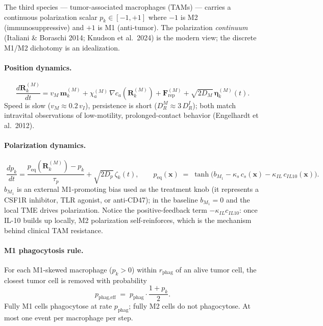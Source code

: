 \documentclass[11pt,letterpaper]{article}
\begin{document}
The third species --- tumor-associated macrophages (TAMs) --- carries a
continuous polarization scalar $p_k \in [-1,+1]$ where $-1$ is M2
(immunosuppressive) and $+1$ is M1 (anti-tumor). The polarization
\emph{continuum} (Italiani \& Boraschi 2014; Knudson et al.\ 2024) is
the modern view; the discrete M1/M2 dichotomy is an idealization.

\paragraph{Position dynamics.}
\begin{equation}
\frac{d\mathbf{R}_k^{(M)}}{dt}
  = v_M\, \mathbf{m}_k^{(M)}
  + \chi_a^{(M)}\, \nabla c_a(\mathbf{R}_k^{(M)})
  + \mathbf{F}_{\text{rep}}^{(M)}
  + \sqrt{2 D_M}\,\bm{\eta}_k^{(M)}(t).
\end{equation}
Speed is slow ($v_M \approx 0.2\,v_I$), persistence is short
($D_R^M \approx 3\,D_R^I$); both match intravital observations of
low-motility, prolonged-contact behavior (Engelhardt et al.\ 2012).

\paragraph{Polarization dynamics.}
\begin{equation}
\boxed{\;
\frac{d p_k}{dt}
  = \frac{p_{\text{eq}}(\mathbf{R}_k^{(M)}) - p_k}{\tau_p}
  + \sqrt{2 D_p}\,\zeta_k(t),
\qquad
p_{\text{eq}}(\mathbf{x}) \;=\; \tanh\!\big(b_{M_1}
   - \kappa_s\,c_s(\mathbf{x})
   - \kappa_{IL}\,c_{IL10}(\mathbf{x})\big).
\;}
\label{eq:polarization}
\end{equation}
$b_{M_1}$ is an external M1-promoting bias used as the treatment knob
(it represents a CSF1R inhibitor, TLR agonist, or anti-CD47); in the
baseline $b_{M_1}=0$ and the local TME drives polarization. Notice the
positive-feedback term $-\kappa_{IL}c_{IL10}$: once IL-10 builds up
locally, M2 polarization self-reinforces, which is the mechanism behind
clinical TAM resistance.

\paragraph{M1 phagocytosis rule.}
For each M1-skewed macrophage ($p_k > 0$) within $r_{\text{phag}}$ of an
alive tumor cell, the closest tumor cell is removed with probability
\begin{equation}
p_{\text{phag,eff}} \;=\; p_{\text{phag}}\cdot\frac{1+p_k}{2}.
\label{eq:phag}
\end{equation}
Fully M1 cells phagocytose at rate $p_{\text{phag}}$; fully M2 cells do
not phagocytose. At most one event per macrophage per step.
\end{document}
